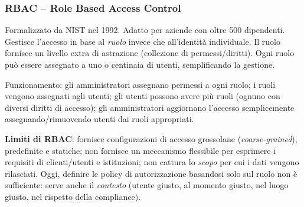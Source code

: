 \documentclass[a4paper,11pt]{article}
\begin{document}
\subsubsection{RBAC -- Role Based Access Control}

\begin{definizione}[RBAC]
Formalizzato da NIST nel 1992. Adatto per aziende con oltre 500 dipendenti. Gestisce l'accesso in base al \emph{ruolo} invece che all'identit\`{a} individuale. Il ruolo fornisce un livello extra di astrazione (collezione di permessi/diritti). Ogni ruolo pu\`{o} essere assegnato a uno o centinaia di utenti, semplificando la gestione.

Funzionamento: gli amministratori assegnano permessi a ogni ruolo; i ruoli vengono assegnati agli utenti; gli utenti possono avere pi\`{u} ruoli (ognuno con diversi diritti di accesso); gli amministratori aggiornano l'accesso semplicemente assegnando/rimuovendo utenti dai ruoli appropriati.

\textbf{Limiti di RBAC}: fornisce configurazioni di accesso grossolane (\emph{coarse-grained}), predefinite e statiche; non fornisce un meccanismo flessibile per esprimere i requisiti di clienti/utenti e istituzioni; non cattura lo \emph{scopo} per cui i dati vengono rilasciati. Oggi, definire le policy di autorizzazione basandosi solo sul ruolo non \`{e} sufficiente: serve anche il \emph{contesto} (utente giusto, al momento giusto, nel luogo giusto, nel rispetto della compliance).
\end{definizione}

\begin{center}
\end{center}
\end{document}
